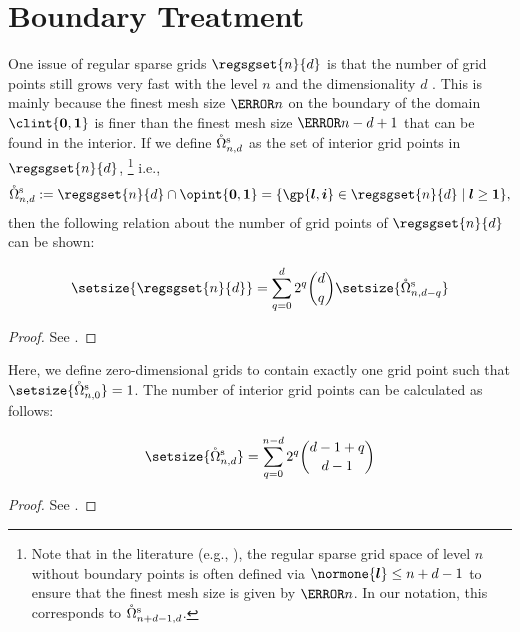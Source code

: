 \section{Boundary Treatment}
\label{sec:24boundary}


\noindent
One issue of regular sparse grids $\regsgset{n}{d}$
is that the number of grid points still grows very fast
with the level $n$ and the dimensionality $d$ \cite{Pflueger10Spatially}.
This is mainly because the finest mesh size $\ms{n}$ on the
boundary of the domain $\clint{\*0, \*1}$ is finer than
the finest mesh size $\ms{n-d+1}$ that can be found in the interior.
If we define $\interiorregsgset{n}{d}$ as the set of
interior grid points in $\regsgset{n}{d}$,%
\footnote{%
  Note that in the literature (e.g., \cite{Pflueger10Spatially}),
  the regular sparse grid space of level $n$ without boundary points is often
  defined via $\normone{\*l} \le n + d - 1$ to ensure that the finest mesh size
  is given by $\ms{n}$.
  In our notation, this corresponds to $\interiorregsgset{n+d-1}{d}$.%
}
i.e.,
\begin{equation}
  \interiorregsgset{n}{d}
  := \regsgset{n}{d} \cap \opint{\*0, \*1}
  = \{\gp{\*l,\*i} \in \regsgset{n}{d} \mid \*l \ge \*1\},
\end{equation}
then the following relation about the number of grid points
of $\regsgset{n}{d}$ can be shown:

\begin{lemma}
  \label{lemma:numberOfGridPointsBoundary}
  \setlength{\abovedisplayskip}{0pt}%
  \begin{equation}
    \setsize{\regsgset{n}{d}}
    = \sum_{q=0}^d 2^q \binom{d}{q} \setsize{\interiorregsgset{n}{d-q}}
  \end{equation}
\end{lemma}
\begin{proof}
  See \cite{Bungartz04Sparse}.
\end{proof}
Here, we define zero-dimensional grids to contain exactly one grid point
such that $\setsize{\interiorregsgset{n}{0}} = 1$.
The number of interior grid points can be calculated as follows:
\begin{lemma}
  \label{lemma:numberOfGridPointsInterior}
  \setlength{\abovedisplayskip}{0pt}%
  \begin{equation}
    \setsize{\interiorregsgset{n}{d}}
    = \sum_{q=0}^{n-d} 2^q \binom{d-1+q}{d-1}
  \end{equation}
\end{lemma}
\begin{proof}
  See \cite{Bungartz04Sparse}.
\end{proof}

